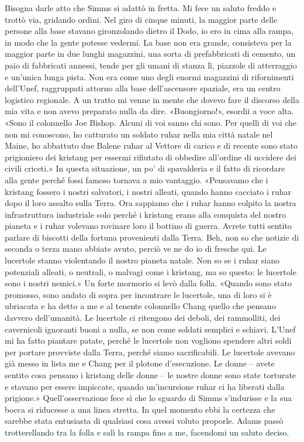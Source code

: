 Bisogna darle atto che Simms si adattò in fretta. Mi fece un saluto
freddo e trottò via, gridando ordini. Nel giro di cinque minuti, la
maggior parte delle persone alla base stavano gironzolando dietro il
Dodo, io ero in cima alla rampa, in modo che la gente potesse vedermi.
La base non era grande, consisteva per la maggior parte in due lunghi
magazzini, una sorta di prefabbricati di cemento, un paio di fabbricati
annessi, tende per gli umani di stanza lì, piazzole di atterraggio e
un'unica lunga pista. Non era come uno degli enormi magazzini di
rifornimenti dell'Unef, raggruppati attorno alla base dell'ascensore
spaziale, era un centro logistico regionale. A un tratto mi venne in
mente che dovevo fare il discorso della mia vita e non avevo preparato
nulla da dire. «Buongiorno!», esordii a voce alta. «Sono il colonnello
Joe Bishop. Alcuni di voi sanno chi sono. Per quelli di voi che non mi
conoscono, ho catturato un soldato ruhar nella mia città natale nel
Maine, ho abbattuto due Balene ruhar al Vettore di carico e di recente
sono stato prigioniero dei kristang per essermi rifiutato di obbedire
all'ordine di uccidere dei civili criceti.» In questa situazione, un po'
di spavalderia e il fatto di ricordare alla gente perché fossi famoso
tornava a mio vantaggio. «Pensavamo che i kristang fossero i nostri
salvatori, i nostri alleati, quando hanno cacciato i ruhar dopo il loro
assalto sulla Terra. Ora sappiamo che i ruhar hanno colpito la nostra
infrastruttura industriale solo perché i kristang erano alla conquista
del nostro pianeta e i ruhar volevano rovinare loro il bottino di
guerra. Avrete tutti sentito parlare di biscotti della fortuna
provenienti dalla Terra. Beh, non so che notizie di seconda o terza mano
abbiate avuto, perciò ve ne do io di fresche qui. Le lucertole stanno
violentando il nostro pianeta natale. Non so se i ruhar siano potenziali
alleati, o neutrali, o malvagi come i kristang, ma so questo: le
lucertole sono i nostri nemici.» Un forte mormorio si levò dalla folla.
«Quando sono stato promosso, sono andato di sopra per incontrare le
lucertole, una di loro si è ubriacata e ha detto a me e al tenente
colonnello Chang quello che pensano davvero dell'umanità. Le lucertole
ci ritengono dei deboli, dei rammolliti, dei cavernicoli ignoranti buoni
a nulla, se non come soldati semplici e schiavi. L'Unef mi ha fatto
piantare patate, perché le lucertole non vogliono spendere altri soldi
per portare provviste dalla Terra, perché siamo sacrificabili. Le
lucertole avevano già messo in lista me e Chang per il plotone
d'esecuzione. Le donne -- avete sentito cosa pensano i kristang delle
donne -- le nostre donne sono state torturate e stavano per essere
impiccate, quando un'incursione ruhar ci ha liberati dalla prigione.»
Quell'osservazione fece sì che lo sguardo di Simms s'indurisse e la sua
bocca si riducesse a una linea stretta. In quel momento ebbi la certezza
che sarebbe stata entusiasta di qualsiasi cosa avessi voluto proporle.
Adams passò trotterellando tra la folla e salì la rampa fino a me,
facendomi un saluto deciso.


